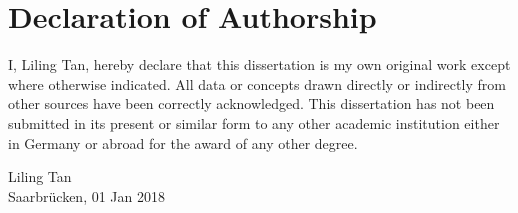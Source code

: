 \chapter*{Declaration of Authorship}

I, Liling Tan, hereby declare that this dissertation is my own original work except where otherwise indicated. All data or concepts drawn directly or indirectly from other sources have been correctly acknowledged. This dissertation has not been submitted in its present or similar form to any other academic institution either in Germany or abroad for the award of any other degree.

\vspace{50mm}



Liling Tan \\
Saarbr\"{u}cken, 01 Jan 2018